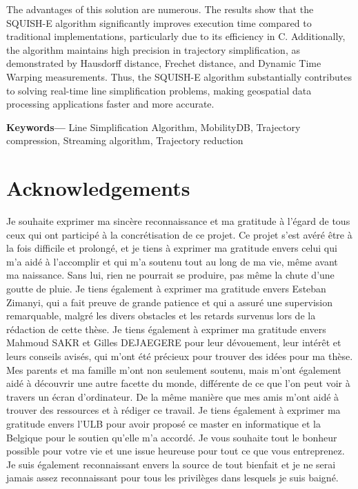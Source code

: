 \documentclass[twoside,12pt, a4paper]{report}
\providecommand{\keywords}[1]
{
  
  \textbf{Keywords---} #1
}
\begin{document}
The advantages of this solution are numerous. The results show that the SQUISH-E algorithm significantly improves execution time compared to traditional implementations, particularly due to its efficiency in C. Additionally, the algorithm maintains high precision in trajectory simplification, as demonstrated by Hausdorff distance, Frechet distance, and Dynamic Time Warping measurements. Thus, the SQUISH-E algorithm substantially contributes to solving real-time line simplification problems, making geospatial data processing applications faster and more accurate.


\vspace{10pt}

\keywords{Line Simplification Algorithm, MobilityDB, Trajectory compression, Streaming algorithm, Trajectory reduction}

\newpage

\section*{Acknowledgements}
Je souhaite exprimer ma sincère reconnaissance et ma gratitude à l'égard de tous ceux qui ont participé à la concrétisation de ce projet. Ce projet s'est avéré être à la fois difficile et prolongé, et je tiens à exprimer ma gratitude envers celui qui m'a aidé à l'accomplir et qui m'a soutenu tout au long de ma vie, même avant ma naissance. Sans lui, rien ne pourrait se produire, pas même la chute d'une goutte de pluie. Je tiens également à exprimer ma gratitude envers Esteban Zimanyi, qui a fait preuve de grande patience et qui a assuré une supervision remarquable, malgré les divers obstacles et les retards survenus lors de la rédaction de cette thèse. Je tiens également à exprimer ma gratitude envers Mahmoud SAKR et Gilles DEJAEGERE pour leur dévouement, leur intérêt et leurs conseils avisés, qui m'ont été précieux pour trouver des idées pour ma thèse. Mes parents et ma famille m'ont non seulement soutenu, mais m'ont également aidé à découvrir une autre facette du monde, différente de ce que l'on peut voir à travers un écran d'ordinateur. De la même manière que mes amis m'ont aidé à trouver des ressources et à rédiger ce travail. Je tiens également à exprimer ma gratitude envers l'ULB pour avoir proposé ce master en informatique et la Belgique pour le soutien qu'elle m'a accordé. Je vous souhaite tout le bonheur possible pour votre vie et une issue heureuse pour tout ce que vous entreprenez. Je suis également reconnaissant envers la source de tout bienfait et je ne serai jamais assez reconnaissant pour tous les privilèges dans lesquels je suis baigné. 
\newpage


\tableofcontents

\listoffigures
\listoftables
\lstlistoflistings












\newpage
\printbibliography
\end{document}
